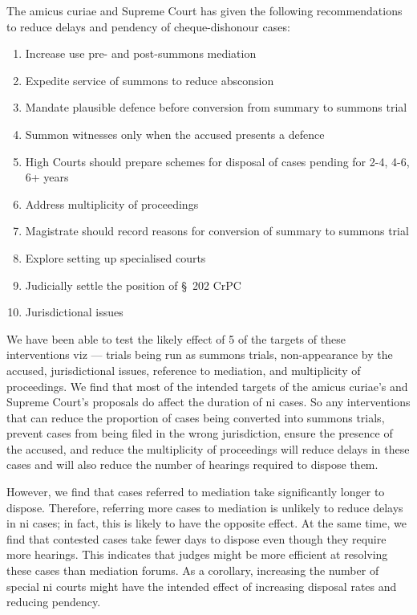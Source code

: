 The amicus curiae and Supreme Court has given the following recommendations to reduce delays and pendency of cheque-dishonour cases:
\begin{enumerate}
\item Increase use pre- and post-summons mediation
\item Expedite service of summons to reduce absconsion
\item Mandate plausible defence before conversion from summary to summons trial
\item Summon witnesses only when the accused presents a defence
\item High Courts should prepare schemes for disposal of cases pending for 2-4, 4-6, 6+ years
\item Address multiplicity of proceedings
\item Magistrate should record reasons for conversion of summary to summons trial
\item Explore setting up specialised courts
\item Judicially settle the position of \S~202 CrPC
\item Jurisdictional issues
\end{enumerate}

We have been able to test the likely effect of 5 of the targets of these interventions viz --- trials being run as summons trials, non-appearance by the accused, jurisdictional issues, reference to mediation, and multiplicity of proceedings. We find that most of the intended targets of the amicus curiae's and Supreme Court's proposals do affect the duration of \gls{ni} cases. So any interventions that can reduce the proportion of cases being converted into summons trials, prevent cases from being filed in the wrong jurisdiction, ensure the presence of the accused, and reduce the multiplicity of proceedings will reduce delays in these cases and will also reduce the number of hearings required to dispose them.

However, we find that cases referred to mediation take significantly longer to dispose. Therefore, referring more cases to mediation is unlikely to reduce delays in \gls{ni} cases; in fact, this is likely to have the opposite effect. At the same time, we find that contested cases take fewer days to dispose even though they require more hearings. This indicates that judges might be more efficient at resolving these cases than mediation forums. As a corollary, increasing the number of special \gls{ni} courts might have the intended effect of increasing disposal rates and reducing pendency.

